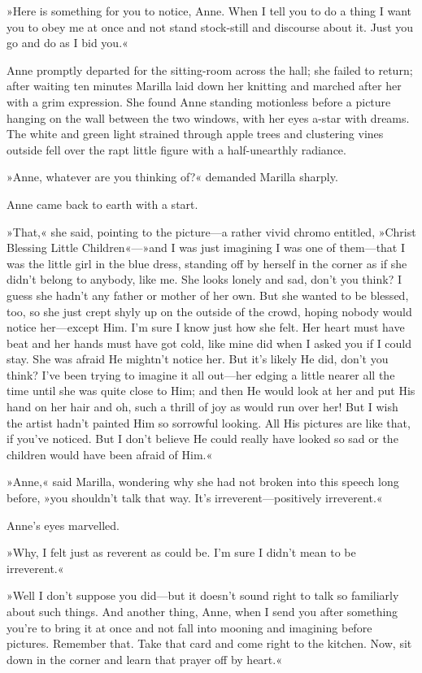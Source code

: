 »Here is something for you to notice, Anne. When I tell you to do a thing I want you to obey me at once and not stand stock-still and discourse about it. Just you go and do as I bid you.«

Anne promptly departed for the sitting-room across the hall; she failed to return; after waiting ten minutes Marilla laid down her knitting and marched after her with a grim expression. She found Anne standing motionless before a picture hanging on the wall between the two windows, with her eyes a-star with dreams. The white and green light strained through apple trees and clustering vines outside fell over the rapt little figure with a half-unearthly radiance.

»Anne, whatever are you thinking of?« demanded Marilla sharply.

Anne came back to earth with a start.

»That,« she said, pointing to the picture—a rather vivid chromo entitled, »Christ Blessing Little Children«—»and I was just imagining I was one of them—that I was the little girl in the blue dress, standing off by herself in the corner as if she didn’t belong to anybody, like me. She looks lonely and sad, don’t you think? I guess she hadn’t any father or mother of her own. But she wanted to be blessed, too, so she just crept shyly up on the outside of the crowd, hoping nobody would notice her—except Him. I’m sure I know just how she felt. Her heart must have beat and her hands must have got cold, like mine did when I asked you if I could stay. She was afraid He mightn’t notice her. But it’s likely He did, don’t you think? I’ve been trying to imagine it all out—her edging a little nearer all the time until she was quite close to Him; and then He would look at her and put His hand on her hair and oh, such a thrill of joy as would run over her! But I wish the artist hadn’t painted Him so sorrowful looking. All His pictures are like that, if you’ve noticed. But I don’t believe He could really have looked so sad or the children would have been afraid of Him.«

»Anne,« said Marilla, wondering why she had not broken into this speech long before, »you shouldn’t talk that way. It’s irreverent—positively irreverent.«

Anne’s eyes marvelled.

»Why, I felt just as reverent as could be. I’m sure I didn’t mean to be irreverent.«

»Well I don’t suppose you did—but it doesn’t sound right to talk so familiarly about such things. And another thing, Anne, when I send you after something you’re to bring it at once and not fall into mooning and imagining before pictures. Remember that. Take that card and come right to the kitchen. Now, sit down in the corner and learn that prayer off by heart.«

